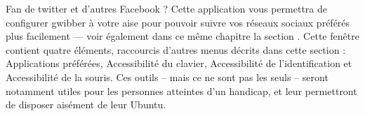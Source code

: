 Fan de twitter et d'autres Facebook ? Cette application vous permettra de configurer gwibber à votre aise pour pouvoir suivre vos réseaux sociaux préférés plus facilement --- voir également dans ce même chapitre la section .
Cette fenêtre contient quatre éléments, raccourcis d'autres menus décrits dans cette section : Applications préférées, Accessibilité du clavier, Accessibilité de l'identification et Accessibilité de la souris. Ces outils -- mais ce ne sont pas les seuls -- seront notamment utiles pour les personnes atteintes d'un handicap, et leur permettront de disposer aisément de leur Ubuntu.
